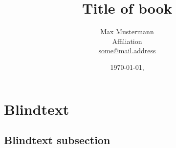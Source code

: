 \documentclass[
11pt,
bibliography=totoc,
numbers=noenddot,
]{scrbook}
\title{Title of book}
\author{Max Mustermann \\
  Affiliation \\
  \url{some@mail.address} \\}
\date{\ddmmyyyydate\today, \currenttime}
\begin{document}
\maketitle
\frontmatter
\tableofcontents
\mainmatter



\chapter{Blindtext}

\lipsum

\section{Blindtext subsection}

\lipsum




\insertBib
\end{document}
